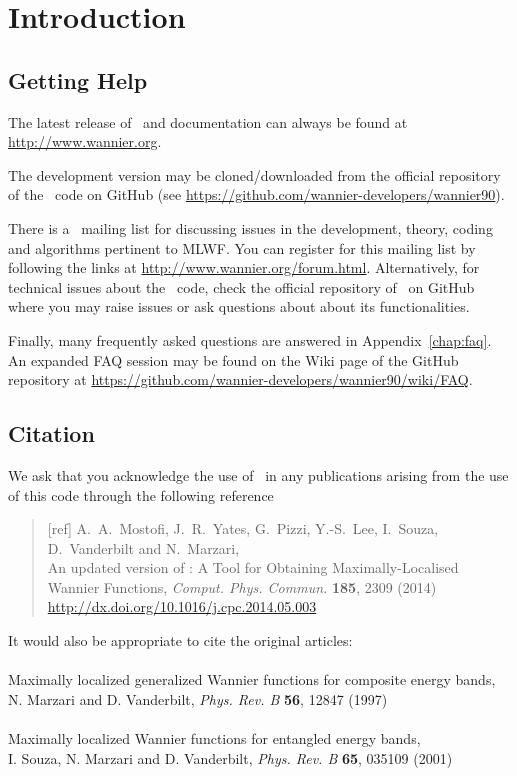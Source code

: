 \chapter*{Introduction}
\section*{Getting Help}
The latest release of \wannier\ and documentation can always
be found at \url{http://www.wannier.org}.

The development version may be cloned/downloaded from the
official repository of the \wannier\ code on GitHub 
(see \url{https://github.com/wannier-developers/wannier90}).

There is a \wannier\ mailing list for discussing issues in the
development, theory, coding and algorithms pertinent to MLWF.
You can register for this mailing list by following the links at
\url{http://www.wannier.org/forum.html}.
Alternatively, for technical issues about the \wannier\ code, 
check the official repository of \wannier\ on GitHub 
where you may raise issues or ask questions about about its
functionalities.

Finally, many frequently asked questions are answered in
Appendix~\ref{chap:faq}. An expanded FAQ session may be
found on the Wiki page of the GitHub repository at 
\url{https://github.com/wannier-developers/wannier90/wiki/FAQ}. 

\section*{Citation}
We ask that you acknowledge the use of \wannier\ in any publications
arising from the use of this code through the following reference
\begin{quote}
[ref] A.~A.~Mostofi, J.~R.~Yates, G.~Pizzi, Y.-S.~Lee, I.~Souza, D.~Vanderbilt
and N.~Marzari,\\
An updated version of \wannier: 
A Tool for Obtaining Maximally-Localised Wannier
  Functions, {\it Comput. Phys. Commun.} {\bf 185}, 2309 (2014)\\
\url{http://dx.doi.org/10.1016/j.cpc.2014.05.003}

\end{quote}                                                              

It would also be appropriate to cite the original articles:\\\\
Maximally localized generalized Wannier functions for composite
  energy bands,\\ 
N. Marzari and D. Vanderbilt, {\it Phys. Rev. B} {\bf 56}, 12847 (1997)\\\\
Maximally localized Wannier functions for entangled energy bands,\\
I. Souza, N. Marzari and D. Vanderbilt, {\it Phys. Rev. B} {\bf 65}, 035109 (2001)


